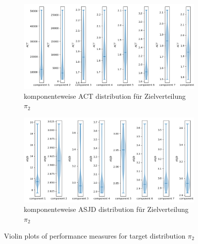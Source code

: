 \documentclass{scrartcl}
\begin{document}
    \begin{figure}
        \centering
        \begin{subfigure}{0.45\textheight}
              \centering
              \includegraphics[width=.8\linewidth]{../figs/ACT_pi_2.png}
              \caption{komponenteweise ACT distribution für Zielverteilung $\pi_2$}
              \label{violin_plots_pi_2_act}
        \end{subfigure}
        \begin{subfigure}{0.45\textheight}
              \centering
              \includegraphics[width=.8\linewidth]{../figs/ASJD_pi_2.png}
              \caption{komponenteweise ASJD distribution für Zielverteilung $\pi_2$}
              \label{violin_plots_pi_2_asjd}
        \end{subfigure}
        \caption{Violin plots of performance measures for target distribution $\pi_2$}
        \label{violin_plots_pi_2}
    \end{figure}
\end{document}
